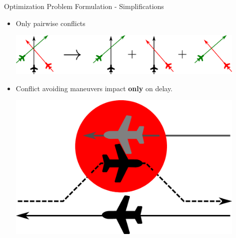 \documentclass[10pt]{beamer}
\begin{document}
\begin{frame}[t]{Optimization Problem Formulation - Simplifications}
    \begin{itemize}
        \item Only pairwise conflicts 
            \hfill
            \begin{minipage}[c]{0.6\linewidth}
                \includegraphics[width=0.9\textwidth]{images/pairwise_conflicts.pdf}
            \end{minipage}
        \item Conflict avoiding maneuvers impact {\bf only} on delay.
            \hfill
            \begin{minipage}[c]{0.3\linewidth}
                \includegraphics[width=0.9\textwidth]{images/conflict_avoiding_maneuver_pairwise_overlay1.pdf}
            \end{minipage}
    \end{itemize} 
\end{frame}
\end{document}
